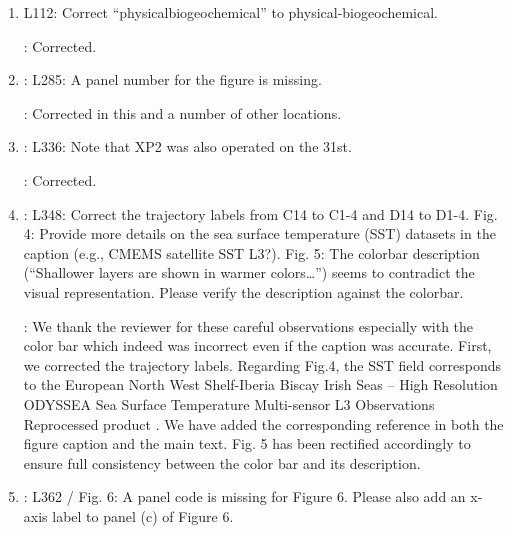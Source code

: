 \documentclass[a4paper]{article}
\begin{document}
\begin{answers}
\begin{enumerate}
    \begin{quote}

      \ldots moreover the novelty of our work is in demonstrating the
      applicability of using our AUVs that can control their
      trajectory using onboard computation. While well suited for
      embedded reasoning for adaptive sampling
      \cite{das11b,rajan12,chrpa15,fossum18,fossum19,fossum19b}, this
      effort used shore-generated waypoints distributed to all AUVs, a
      task which could be moved onboard in the future.

    \end{quote}

  \item L112: Correct “physicalbiogeochemical” to
    physical-biogeochemical.
    
    \action: Corrected.

  \item \reply: L285: A panel number for the figure is missing.
    
    \action: Corrected in this and a number of other locations. 
    
  \item \reply: L336: Note that XP2 was also operated on the 31st.
    
    \action: Corrected.

  \item \reply: L348: Correct the trajectory labels from C14 to C1-4
    and D14 to D1-4. Fig. 4: Provide more details on the sea surface
    temperature (SST) datasets in the caption (e.g., CMEMS satellite
    SST L3?). Fig.  5: The colorbar description (“Shallower layers are
    shown in warmer colors…”) seems to contradict the visual
    representation. Please verify the description against the
    colorbar.
    
    \action: We thank the reviewer for these careful observations
    especially with the color bar which indeed was incorrect even if
    the caption was accurate.  First, we corrected the trajectory
    labels. Regarding Fig.4, the SST field corresponds to the European
    North West Shelf-Iberia Biscay Irish Seas – High Resolution
    ODYSSEA Sea Surface Temperature Multi-sensor L3 Observations
    Reprocessed product \cite{NWS_IBI_SST_L3}. We have added the
    corresponding reference in both the figure caption and the main
    text. Fig. 5 has been rectified accordingly to ensure full
    consistency between the color bar and its description.

  \item \reply: L362 / Fig. 6: A panel code is missing for Figure 6.
    Please also add an x-axis label to panel (c) of Figure 6.
    

\end{enumerate}
\end{answers}
\end{document}
